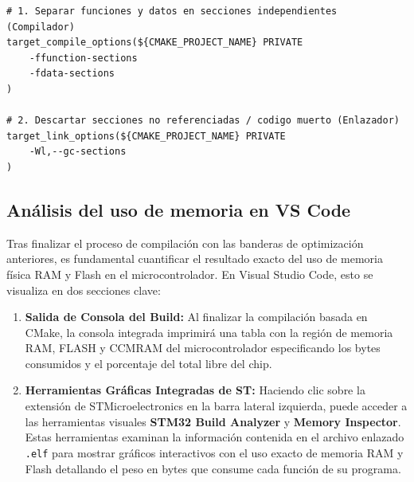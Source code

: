 \documentclass[
10pt, %
a4paper, %
oneside, %
headinclude,footinclude, %
BCOR5mm, %
]{scrartcl}
\begin{document}
\begin{lstlisting}[style=CMakeStyle]
# 1. Separar funciones y datos en secciones independientes (Compilador)
target_compile_options(${CMAKE_PROJECT_NAME} PRIVATE
    -ffunction-sections
    -fdata-sections
)

# 2. Descartar secciones no referenciadas / codigo muerto (Enlazador)
target_link_options(${CMAKE_PROJECT_NAME} PRIVATE
    -Wl,--gc-sections
)
\end{lstlisting}

\subsection{Análisis del uso de memoria en VS Code}
Tras finalizar el proceso de compilación con las banderas de optimización anteriores, es fundamental cuantificar el resultado exacto del uso de memoria física RAM y Flash en el microcontrolador. En Visual Studio Code, esto se visualiza en dos secciones clave:

\begin{enumerate}
	\item \textbf{Salida de Consola del Build:} Al finalizar la compilación basada en CMake, la consola integrada imprimirá una tabla con la región de memoria RAM, FLASH y CCMRAM del microcontrolador especificando los bytes consumidos y el porcentaje del total libre del chip.
	\item \textbf{Herramientas Gráficas Integradas de ST:} Haciendo clic sobre la extensión de STMicroelectronics en la barra lateral izquierda, puede acceder a las herramientas visuales \textbf{STM32 Build Analyzer} y \textbf{Memory Inspector}. Estas herramientas examinan la información contenida en el archivo enlazado \texttt{.elf} para mostrar gráficos interactivos con el uso exacto de memoria RAM y Flash detallando el peso en bytes que consume cada función de su programa.
\end{enumerate}
\end{document}
